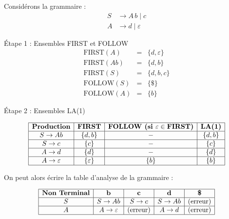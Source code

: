 \begin{example}
    Considérons la grammaire :
        \[
            \begin{aligned}
                S &\to A\,b \mid c \\
                A &\to d \mid \varepsilon
            \end{aligned}
        \]

    {Étape 1 : Ensembles FIRST et FOLLOW}
        \[
            \begin{array}{lcl}
                \text{FIRST}(A) &=& \{ d, \varepsilon \} \\[3pt]
                \text{FIRST}(A b) &=& \{ d, b \} \\[3pt]
                \text{FIRST}(S) &=& \{ d, b, c \} \\[6pt]
                \text{FOLLOW}(S) &=& \{ \$ \} \\[3pt]
                \text{FOLLOW}(A) &=& \{ b \}
            \end{array}
        \]

    {Étape 2 : Ensembles LA(1)}

        \[
            \begin{array}{|c|c|c|c|}
                \hline
                \textbf{Production} & \textbf{FIRST} & \textbf{FOLLOW (si $\varepsilon \in \text{FIRST}$)} & \textbf{LA(1)} \\
                \hline
                S \to A b & \{d, b\} & - & \{d, b\} \\
                \hline
                S \to c   & \{c\} & - & \{c\} \\
                \hline
                A \to d   & \{d\} & - & \{d\} \\
                \hline
                A \to \varepsilon & \{\varepsilon\} & \{b\} & \{b\} \\
                \hline
            \end{array}
        \]

   On peut alors écrire la table d'analyse de la grammaire : 

        \[ 
            \begin{array}{|c|c|c|c|c|}
                \hline 
                \textbf{Non Terminal} & \textbf{b} & \textbf{c} & \textbf{d} & \textbf{\$} \\ 
                \hline 
                {S} & S \rightarrow Ab & S \rightarrow c & S \rightarrow Ab & \text{(erreur)} \\ 
                \hline 
                {A} & A \rightarrow \varepsilon & \text{(erreur)} & A \rightarrow d & \text{(erreur)} \\ 
                \hline
            \end{array}
        \] 
\end{example}


